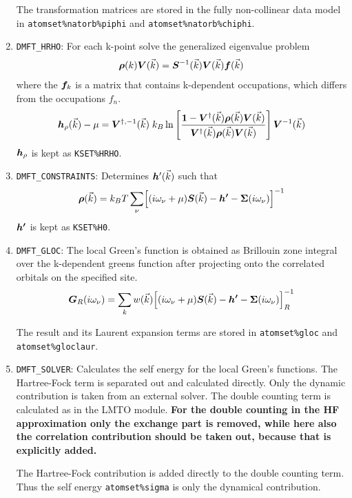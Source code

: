 \documentclass[11pt,a4paper]{report}
\begin{document}
\begin{enumerate}
The transformation matrices are stored in the fully non-collinear data
model in \verb|atomset%natorb%piphi| and \verb|atomset%natorb%chiphi|.
%
\item \verb|DMFT_HRHO|: For each k-point solve the generalized
  eigenvalue problem
\begin{eqnarray*}
\bm{\rho}(k)\bm{V}(\vec{k})=
\bm{S}^{-1}(\vec{k})\bm{V}(\vec{k})\bm{f}(\vec{k})
\end{eqnarray*}
where the $\bm{f}_k$ is a matrix that contains k-dependent
occupations, which differs from the occupations $f_n$.
\begin{eqnarray}
\bm{h}_\rho(\vec{k})-\mu=\bm{V}^{\dagger,-1}(\vec{k})\; k_B
\ln\left[
\frac{\bm{1}-\bm{V}^\dagger(\vec{k})\bm{\rho}(\vec{k})\bm{V}(\vec{k})}
{\bm{V}^\dagger(\vec{k})\bm{\rho}(\vec{k})\bm{V}(\vec{k})}
\right]\bm{V}^{-1}(\vec{k})
\end{eqnarray}
$\bm{h}_\rho$ is kept as \verb|KSET%HRHO|.
%
\item \verb|DMFT_CONSTRAINTS|: Determines $\bm{h}'(\vec{k})$ such that
\begin{eqnarray}
\bm{\rho}(\vec{k})=k_BT\sum_\nu \Bigl[(i\omega_\nu+\mu)\bm{S}(\vec{k})-
\bm{h'}-\bm{\Sigma}(i\omega_\nu)\Bigr]^{-1}
\end{eqnarray}
$\bm{h'}$ is kept as \verb|KSET%H0|.
%
\item \verb|DMFT_GLOC|: The local Green's function is obtained as
  Brillouin zone integral over the k-dependent greens function after
  projecting onto the correlated orbitals on the specified site.
\begin{eqnarray}
\bm{G}_R(i\omega_\nu)=\sum_k w(\vec{k})
\Bigl[(i\omega_\nu+\mu)\bm{S}(\vec{k})-
\bm{h'}-\bm{\Sigma}(i\omega_\nu)\Bigr]^{-1}_R
\end{eqnarray}

The result and its Laurent expansion terms are stored in
\verb|atomset%gloc| and \verb|atomset%gloclaur|.
%
\item \verb|DMFT_SOLVER|: Calculates the self energy for the local
  Green's functions. The Hartree-Fock term is separated out and
  calculated directly. Only the dynamic contribution is taken from an
  external solver. The double counting term is calculated as in the
  LMTO module. \textbf{For the double counting in the HF approximation
    only the exchange part is removed, while here also the correlation
    contribution should be taken out, because that is explicitly
    added.}

  The Hartree-Fock contribution is added directly to the double
  counting term. Thus the self energy \verb|atomset%sigma| is only
  the dynamical contribution.


\end{enumerate}
\end{document}
